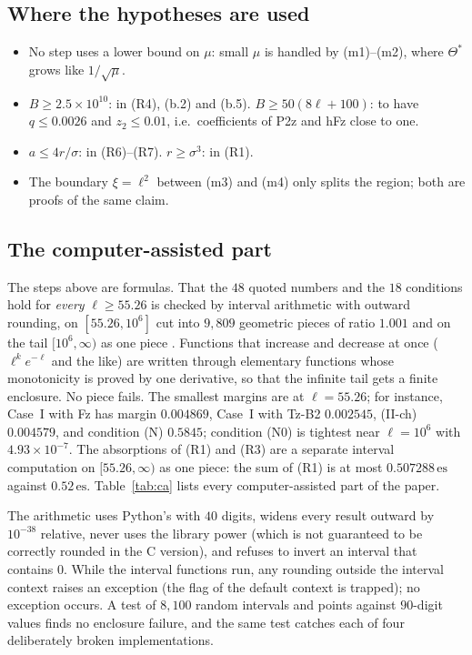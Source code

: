 \subsection{Where the hypotheses are used}

\begin{itemize}
\item No step uses a lower bound on $\mu$: small $\mu$ is handled by (m1)--(m2), where $\Theta^*$ grows like $1/\sqrt\mu$.
\item $B\ge2.5\times10^{10}$: in (R4), (b.2) and (b.5). $B\ge50(8\ell+100)$: to have $q\le0.0026$ and $z_2\le0.01$, i.e.\ coefficients of P2z and hFz close to one.
\item $a\le4r/\sigma$: in (R6)--(R7). $r\ge\sigma^3$: in (R1).
\item The boundary $\xi=\ell^2$ between (m3) and (m4) only splits the region; both are proofs of the same claim.
\end{itemize}

\subsection{The computer-assisted part}
\label{sec:ca}

The steps above are formulas.
That the $48$ quoted numbers and the $18$ conditions hold for \emph{every} $\ell\ge55.26$ is checked by interval arithmetic with outward rounding, on $[55.26,10^6]$ cut into $9{,}809$ geometric pieces of ratio $1.001$ and on the tail $[10^6,\infty)$ as one piece .
Functions that increase and decrease at once ($\ell^ke^{-\ell}$ and the like) are written through elementary functions whose monotonicity is proved by one derivative, so that the infinite tail gets a finite enclosure.
No piece fails.
The smallest margins are at $\ell=55.26$; for instance, Case~I with Fz has margin $0.004869$, Case~I with Tz-B2 $0.002545$, (II-ch) $0.004579$, and condition (N) $0.5845$; condition (N0) is tightest near $\ell=10^6$ with $4.93\times10^{-7}$.
The absorptions of (R1) and (R3) are a separate interval computation on $[55.26,\infty)$ as one piece: the sum of (R1) is at most $0.507288\,\mathrm{es}$ against $0.52\,\mathrm{es}$.
Table~\ref{tab:ca} lists every computer-assisted part of the paper.

The arithmetic uses Python's  with $40$ digits, widens every result outward by $10^{-38}$ relative, never uses the library power (which is not guaranteed to be correctly rounded in the C version), and refuses to invert an interval that contains $0$.
While the interval functions run, any rounding outside the interval context raises an exception (the  flag of the default context is trapped); no exception occurs.
A test of $8{,}100$ random intervals and points against $90$-digit values finds no enclosure failure, and the same test catches each of four deliberately broken implementations.

